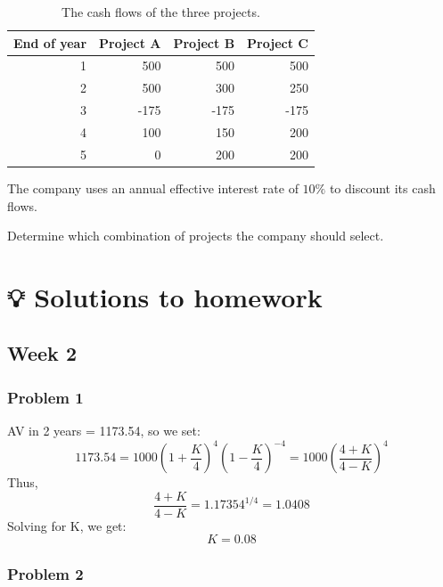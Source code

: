 \documentclass[
]{book}
\begin{document}
\begin{table}[!h]

\caption{\label{tab:week1}The cash flows of the three projects.}
\centering
\begin{tabular}[t]{r|r|r|r}
\hline
End of year & Project A & Project B & Project C\\
\hline
1 & 500 & 500 & 500\\
\hline
2 & 500 & 300 & 250\\
\hline
3 & -175 & -175 & -175\\
\hline
4 & 100 & 150 & 200\\
\hline
5 & 0 & 200 & 200\\
\hline
\end{tabular}
\end{table}

The company uses an annual effective interest rate of \(10\%\) to discount its cash flows.

Determine which combination of projects the company should select.

\hypertarget{solutions-to-homework}{%
\chapter*{💡 Solutions to homework}\label{solutions-to-homework}}

\hypertarget{week-2}{%
\section*{Week 2}\label{week-2}}

\hypertarget{problem-1}{%
\subsection*{Problem 1}\label{problem-1}}

AV in 2 years = 1173.54, so we set:
\[1173.54=1000\left(1+\frac{K}{4}\right)^{4}\left(1-\frac{K}{4}\right)^{-4}=1000\left(\frac{4+K}{4-K}\right)^{4}\]
Thus,
\[\frac{4+K}{4-K}=1.17354^{1/4}=1.0408\]
Solving for K, we get:
\[K=0.08\]

\hypertarget{problem-2}{%
\subsection*{Problem 2}\label{problem-2}}
\end{document}
